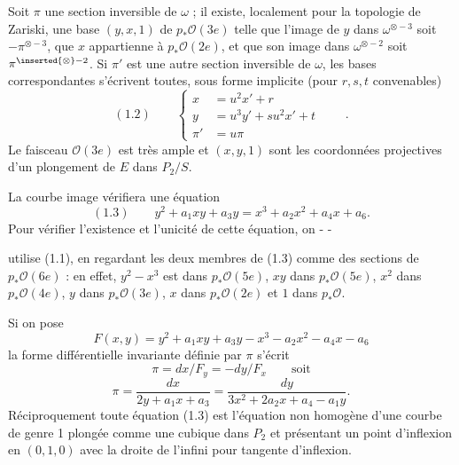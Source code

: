 Soit $\pi$ une section inversible de $\omega$ ; il existe, localement pour la topologie de Zariski, une base $(y,x,1)$ de $p_*\mathcal O(3e)$ telle que l'image de $y$ dans $\omega^{\otimes-3}$ soit $-\pi^{\otimes-3}$, que $x$ appartienne à $p_*\mathcal O(2e)$, et que son image dans $\omega^{\otimes-2}$ soit $\pi^{\inserted{\otimes}-2}$. Si $\pi'$ est une autre section inversible de $\omega$, les bases correspondantes s'écrivent toutes, sous forme implicite (pour $r,s,t$ convenables)
\[
(1.2)\qquad\left\{\begin{aligned}
x&=u^2x'+r\\
y&=u^3y'+su^2x'+t\\
\pi'&=u\pi
\end{aligned}\right.\qquad .
\]
Le faisceau $\mathcal O(3e)$ est très ample et $(x,y,1)$ sont les coordonnées projectives d'un plongement de $E$ dans $P_2/S$.

La courbe image vérifiera une équation
\[
(1.3)\qquad y^2+a_1xy+a_3y=x^3+a_2x^2+a_4x+a_6.
\]
Pour vérifier l'existence et l'unicité de cette équation, on
-  -

utilise (1.1), en regardant les deux membres de (1.3) comme des sections de $p_*\mathcal O(6e)$ : en effet, $y^2-x^3$ est dans $p_*\mathcal O(5e)$, $xy$ dans $p_*\mathcal O(5e)$, $x^2$ dans $p_*\mathcal O(4e)$, $y$ dans $p_*\mathcal O(3e)$, $x$ dans $p_*\mathcal O(2e)$ et $1$ dans $p_*\mathcal O$.

Si on pose
\[
F(x,y)=y^2+a_1xy+a_3y-x^3-a_2x^2-a_4x-a_6
\]
la forme différentielle invariante définie par $\pi$ s'écrit
\[
\pi=dx/F_y=-dy/F_x\qquad\text{soit}
\]
\[
\pi=\frac{dx}{2y+a_1x+a_3}=\frac{dy}{3x^2+2a_2x+a_4-a_1y}.
\]
Réciproquement toute équation (1.3) est l'équation non homogène d'une courbe de genre 1 plongée comme une cubique dans $P_2$ et présentant un point d'inflexion en $(0,1,0)$ avec la droite de l'infini pour tangente d'inflexion.

